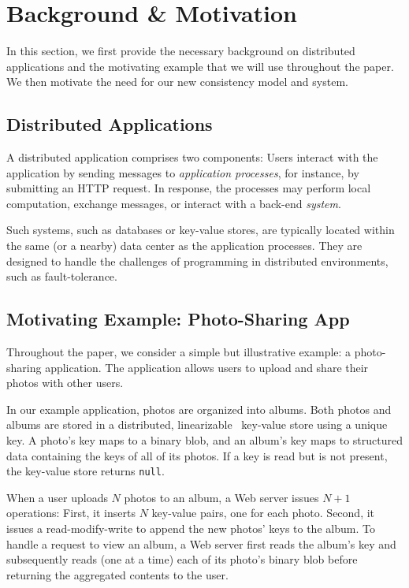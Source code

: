 \section{Background \& Motivation}

In this section, we first provide the necessary background on 
distributed applications and the motivating example that we will
use throughout the paper. We then motivate the need for our
new consistency model and system. 

\subsection{Distributed Applications}

A distributed application comprises two components: Users
interact with the application by sending messages to
\textit{application processes}, for instance, by submitting
an HTTP request. In response, the 
processes may perform local computation, exchange messages, or
interact with a back-end \textit{system}.

Such systems, such as databases or key-value stores, are typically
located within the same (or a nearby) data center as the application 
processes. They are designed to handle the challenges of
programming in distributed environments, such as fault-tolerance.

\subsection{Motivating Example: Photo-Sharing App}

Throughout the paper, we consider a simple but illustrative
example: a photo-sharing application. The application allows
users to upload and share their photos with other users.

In our example application, photos are organized into
albums. Both photos and albums are stored in a distributed,
linearizable~\cite{herlihy1990linearizability} key-value store
using a unique key. A photo's key maps to a binary blob, and
an album's key maps to structured data containing the keys of
all of its photos. If a key is read but is not present, the
key-value store returns \texttt{null}.

When a user uploads $N$ photos to an album, a Web server
issues $N+1$ operations: First, it inserts $N$ key-value
pairs, one for each photo. Second, it issues a read-modify-write
to append the new photos' keys to the album. To handle a request to
view an album, a Web server first reads the album's key and subsequently
reads (one at a time) each of its photo's binary blob before
returning the aggregated contents to the user.

